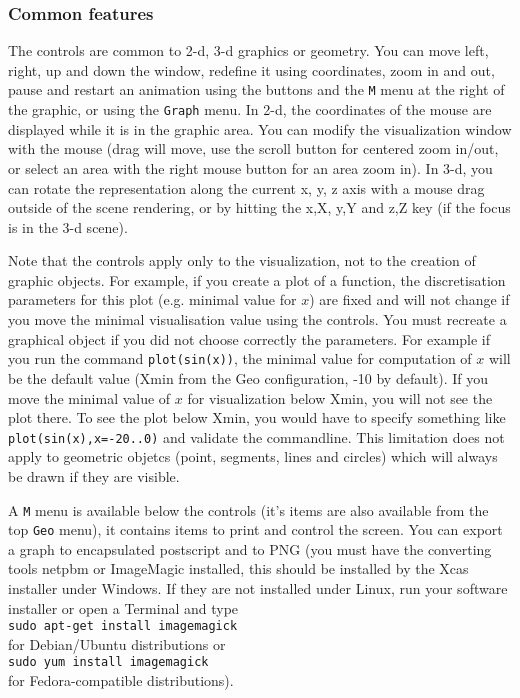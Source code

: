 \documentclass{article}
\begin{document}
\subsubsection{Common features}
The controls are common to 2-d, 3-d graphics or geometry. You can
move left, right, up and down the window, redefine it using
coordinates, zoom in and out, pause and restart an animation using the
buttons and the {\tt M} menu at the right of the graphic, or 
using the {\tt Graph} menu.
In 2-d, the coordinates 
of the mouse are displayed while it is in the graphic area. 
You can modify the visualization
window with the mouse (drag will move, 
use the scroll button for centered zoom in/out, or select an area with
the right mouse button for an area zoom in).
In 3-d,
you can rotate the representation along the current x, y, z axis
with a mouse drag outside of the scene rendering, or
by hitting the x,X, y,Y and z,Z key (if the focus is in the 3-d scene).

Note that the controls apply only to the visualization, not to the creation
of graphic objects. For example, if you create a plot of a function,
the discretisation parameters for this plot (e.g. minimal value for
$x$) are fixed and will not change if you move the minimal visualisation
value using the controls. You must recreate a graphical object if
you did not choose correctly the parameters. For example if you
run the command \verb|plot(sin(x))|, the minimal value for computation
of $x$ will be the default value 
(Xmin from the Geo configuration, -10 by default). If
you move the minimal value of $x$ for visualization below Xmin, you will
not see the plot there. To see the plot below Xmin, you would have
to specify something like \verb|plot(sin(x),x=-20..0)| and validate
the commandline. This limitation does not apply to geometric objetcs
(point, segments, lines and circles) 
which will always be drawn if they are visible.

A {\tt M} menu is available below the controls (it's items are also available
from the top {\tt Geo} menu), 
it contains items to print
and control the screen. You can export a graph to encapsulated
postscript and to PNG (you must have the converting tools 
netpbm or ImageMagic
installed, this should be installed by the Xcas installer under Windows. If they
are not installed under Linux, run your software installer or 
open a Terminal
and type \\
\verb|sudo apt-get install imagemagick| \\
for Debian/Ubuntu distributions or\\
\verb|sudo yum install imagemagick| \\
for Fedora-compatible distributions).
\end{document}
